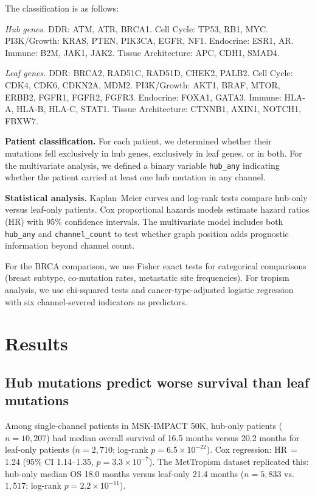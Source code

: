 \documentclass[11pt]{article}
\begin{document}
The classification is as follows:

\emph{Hub genes.}
DDR: ATM, ATR, BRCA1.
Cell Cycle: TP53, RB1, MYC.
PI3K/Growth: KRAS, PTEN, PIK3CA, EGFR, NF1.
Endocrine: ESR1, AR.
Immune: B2M, JAK1, JAK2.
Tissue Architecture: APC, CDH1, SMAD4.

\emph{Leaf genes.}
DDR: BRCA2, RAD51C, RAD51D, CHEK2, PALB2.
Cell Cycle: CDK4, CDK6, CDKN2A, MDM2.
PI3K/Growth: AKT1, BRAF, MTOR, ERBB2, FGFR1, FGFR2, FGFR3.
Endocrine: FOXA1, GATA3.
Immune: HLA-A, HLA-B, HLA-C, STAT1.
Tissue Architecture: CTNNB1, AXIN1, NOTCH1, FBXW7.

\textbf{Patient classification.}
For each patient, we determined whether their mutations fell
exclusively in hub genes, exclusively in leaf genes, or in both.
For the multivariate analysis, we defined a binary variable
\texttt{hub\_any} indicating whether the patient carried at least one
hub mutation in any channel.

\textbf{Statistical analysis.}
Kaplan--Meier curves and log-rank tests compare hub-only versus
leaf-only patients. Cox proportional hazards models estimate hazard
ratios (HR) with 95\% confidence intervals. The multivariate model
includes both \texttt{hub\_any} and \texttt{channel\_count} to test
whether graph position adds prognostic information beyond channel
count.

For the BRCA comparison, we use Fisher exact tests for categorical
comparisons (breast subtype, co-mutation rates, metastatic site
frequencies). For tropism analysis, we use chi-squared tests and
cancer-type-adjusted logistic regression with six channel-severed
indicators as predictors.

\section{Results}
\label{sec:results}

\subsection{Hub mutations predict worse survival than leaf mutations}
\label{sec:hub-leaf}

Among single-channel patients in MSK-IMPACT 50K, hub-only patients
($n = 10{,}207$) had median overall survival of 16.5 months versus
20.2 months for leaf-only patients ($n = 2{,}710$; log-rank
$p = 6.5 \times 10^{-22}$). Cox regression: HR\,$=$\,1.24 (95\% CI
1.14--1.35, $p = 3.3 \times 10^{-7}$). The MetTropism dataset
replicated this: hub-only median OS 18.0 months versus leaf-only
21.4 months ($n = 5{,}833$ vs.\ $1{,}517$; log-rank
$p = 2.2 \times 10^{-11}$).
\end{document}
